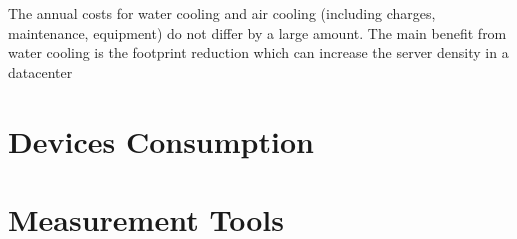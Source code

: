                 \begin{figure}[h!tb]
                    \centering
                    \label{tab:life_cycle_costs_water_cooled_air_cooled}
                \end{figure}
                The annual costs for water cooling and air cooling (including charges, maintenance, equipment) do not differ by a large amount. The main benefit from water cooling is the footprint reduction which can increase the server density in a datacenter%

\pagebreak%
    
\section{Devices Consumption} \label{sec2:devices_consumption} 
    
\section{Measurement Tools} \label{sec2:tools}


